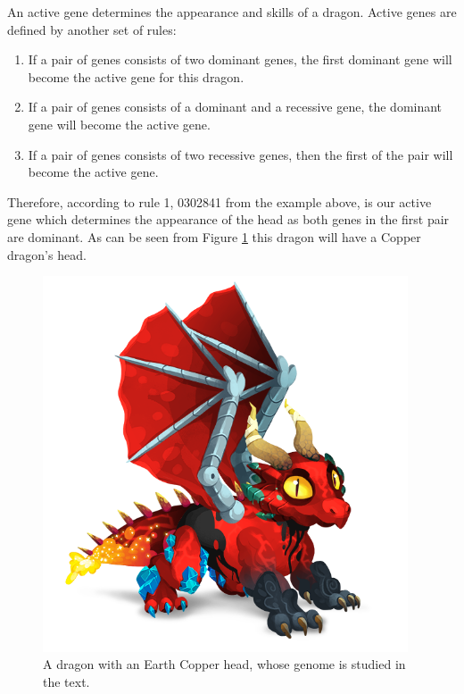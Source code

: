 \documentclass[12pt]{article}
\begin{document}
An active gene determines the appearance and skills of a dragon. Active genes are defined by another set of rules:

\begin{enumerate}
	\item If a pair of genes consists of two dominant genes, the first dominant gene will become the active gene for this dragon.
	\item If a pair of genes consists of a dominant and a recessive gene, the dominant gene will become the active gene.
	\item If a pair of genes consists of two recessive genes, then the first of the pair will become the active gene.
\end{enumerate}

Therefore, according to rule 1, 0302841 from the example above, is our active gene which determines the appearance of the head as both genes in the first pair are dominant. As can be seen from Figure \ref{fig:A_dragon_with_an_Earth_Copper_head_whose_genome_is_studied_in_the_text} this dragon will have a Copper dragon's head.\par

\begin{Center}

\begin{figure}[H]
	\begin{Center}
		\includegraphics[width=4.26in,height=4.38in]{./media/BGimage28.png}
		\caption{A dragon with an Earth Copper head, whose genome is studied in the text.}
		\label{fig:A_dragon_with_an_Earth_Copper_head_whose_genome_is_studied_in_the_text}
	\end{Center}
\end{figure}


\end{Center}\par
\end{document}
